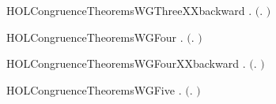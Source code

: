 \newcommand{\HOLCongruenceTheoremsWGThree}{\UseVerbatim{HOLCongruenceTheoremsWGThree}}
\begin{SaveVerbatim}{HOLCongruenceTheoremsWGThreeXXbackward}
\HOLTokenTurnstile{} \HOLSymConst{\HOLTokenForall{}} .  \ensuremath{(}\HOLTokenLambda{}. \HOLSymConst{\ensuremath{\ldotp}} \ensuremath{)} \HOLSymConst{\HOLTokenImp{}}  
\end{SaveVerbatim}
\newcommand{\HOLCongruenceTheoremsWGThreeXXbackward}{\UseVerbatim{HOLCongruenceTheoremsWGThreeXXbackward}}
\begin{SaveVerbatim}{HOLCongruenceTheoremsWGFour}
\HOLTokenTurnstile{} \HOLSymConst{\HOLTokenForall{}} .   \HOLSymConst{\HOLTokenConj{}}   \HOLSymConst{\HOLTokenImp{}}  \ensuremath{(}\HOLTokenLambda{}.   \HOLSymConst{\ensuremath{+}}  \ensuremath{)}
\end{SaveVerbatim}
\newcommand{\HOLCongruenceTheoremsWGFour}{\UseVerbatim{HOLCongruenceTheoremsWGFour}}
\begin{SaveVerbatim}{HOLCongruenceTheoremsWGFourXXbackward}
\HOLTokenTurnstile{} \HOLSymConst{\HOLTokenForall{}} .  \ensuremath{(}\HOLTokenLambda{}.   \HOLSymConst{\ensuremath{+}}  \ensuremath{)} \HOLSymConst{\HOLTokenImp{}}   \HOLSymConst{\HOLTokenConj{}}  
\end{SaveVerbatim}
\newcommand{\HOLCongruenceTheoremsWGFourXXbackward}{\UseVerbatim{HOLCongruenceTheoremsWGFourXXbackward}}
\begin{SaveVerbatim}{HOLCongruenceTheoremsWGFive}
\HOLTokenTurnstile{} \HOLSymConst{\HOLTokenForall{}} .   \HOLSymConst{\HOLTokenConj{}}   \HOLSymConst{\HOLTokenImp{}}  \ensuremath{(}\HOLTokenLambda{}.   \HOLSymConst{\ensuremath{\mid}}  \ensuremath{)}
\end{SaveVerbatim}
